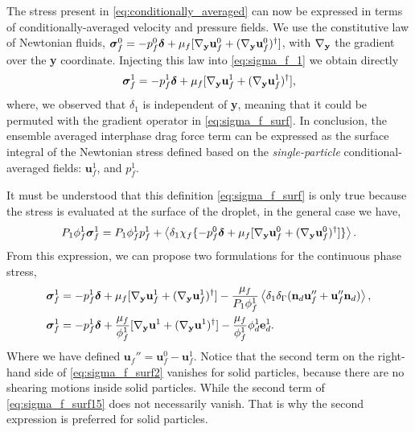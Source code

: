 The stress present in \ref{eq:conditionally_averaged} can now be expressed in terms of conditionally-averaged velocity and pressure fields. 
We use the constitutive law of Newtonian fluids, $\bm\sigma_f^0 = -p_f^0 \bm\delta + \mu_f [{\mathbf{\nabla}_\textbf{y}} \textbf{u}_f^0+ ({\mathbf{\nabla}_\textbf{y}} \textbf{u}_f^0)^\dagger]$, with ${\mathbf{\nabla}_\textbf{y}}$ the gradient over the \textbf{y} coordinate.
Injecting this law into \ref{eq:sigma_f_1} we obtain directly 
\begin{equation}
    \bm\sigma_f^1
    = - p_f^1 \bm\delta
    +\mu_f [\pddy \textbf{u}_f^1+(\pddy \textbf{u}_f^1)^\dagger], 
    \label{eq:sigma_f_surf}
\end{equation}
where, we observed that $\delta_1$ is independent of \textbf{y}, meaning that it could be permuted with the gradient operator in \ref{eq:sigma_f_surf}. 
In conclusion, the ensemble averaged interphase drag force term can be expressed as the surface integral of the Newtonian stress defined based on the \textit{single-particle} conditional-averaged fields: $\textbf{u}_f^1$, and $p_f^1$. 

It must be understood that this definition \eqref{eq:sigma_f_surf} is only true because the stress is evaluated at the surface of the droplet, in the general case we have, 
\begin{equation}
    P_1 \phi_f^1 \bm\sigma_f^1
    =
    P_1 \phi_f^1 p_f^1
    +  \left<\delta_1\chi_f \{ - p_f^0 \bm\delta + \mu_f [{\mathbf{\nabla}_\textbf{y}} \textbf{u}_f^0+  ({\mathbf{\nabla}_\textbf{y}} \textbf{u}_f^0)^\dagger]\}\right>. 
\end{equation}
From this expression, we can propose two formulations for the continuous phase stress,   
\begin{align}    
    \bm\sigma_f^1
    &= 
    - p_f^1 \bm\delta 
    + \mu_f [\pddy \textbf{u}_f^1+ (\pddy \textbf{u}_f^1)^\dagger ]
    - \frac{\mu_f }{P_1 \phi_f^1}\avg{\delta_1 \delta_\Gamma (\textbf{n}_d \textbf{u}_f''+  \textbf{u}_f'' \textbf{n}_d)},
    \label{eq:sigma_f_surf15}
    \\
    \bm\sigma_f^1
    &= 
    - p_f^1 \bm\delta 
    + \frac{\mu_f }{\phi_f^1} [\pddy \textbf{u}^1+ (\pddy \textbf{u}^1)^\dagger ]
    - \frac{\mu_f }{\phi_f^1} \phi_d^1 \textbf{e}_d^1. 
    \label{eq:sigma_f_surf2}
\end{align}
Where we have defined $\textbf{u}_f'' = \textbf{u}_f^0 - \textbf{u}_f^1$. 
Notice that the second term on the right-hand side of \ref{eq:sigma_f_surf2} vanishes for solid particles, because there are no shearing motions inside solid particles.
While the second term of \ref{eq:sigma_f_surf15} does not necessarily vanish. 
That is why the second expression is preferred for solid particles. 

